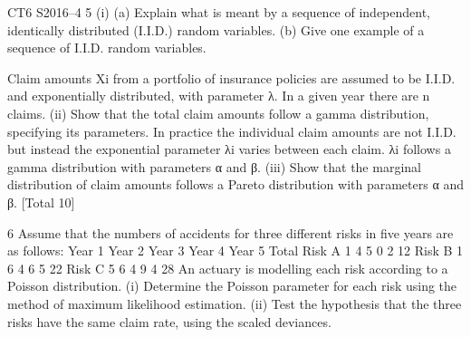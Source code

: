 \documentclass[a4paper,12pt]{article}
\begin{document}
 
CT6 S2016–4
5 (i) (a) Explain what is meant by a sequence of independent, identically
distributed (I.I.D.) random variables.
(b) Give one example of a sequence of I.I.D. random variables.

Claim amounts Xi from a portfolio of insurance policies are assumed to be I.I.D. and
exponentially distributed, with parameter λ. In a given year there are n claims.
(ii) Show that the total claim amounts follow a gamma distribution, specifying its parameters. 
In practice the individual claim amounts are not I.I.D. but instead the exponential parameter λi varies between each claim. λi follows a gamma distribution with parameters α and β.
(iii) Show that the marginal distribution of claim amounts follows a Pareto distribution with parameters α and β. 
[Total 10]
\item
6 Assume that the numbers of accidents for three different risks in five years are as
follows:
  Year 1 Year 2 Year 3 Year 4 Year 5 Total
Risk A 1 4 5 0 2 12
Risk B 1 6 4 6 5 22
Risk C 5 6 4 9 4 28
An actuary is modelling each risk according to a Poisson distribution.
(i) Determine the Poisson parameter for each risk using the method of maximum likelihood estimation.
(ii) Test the hypothesis that the three risks have the same claim rate, using the scaled deviances. 

\newpage
\end{document}
